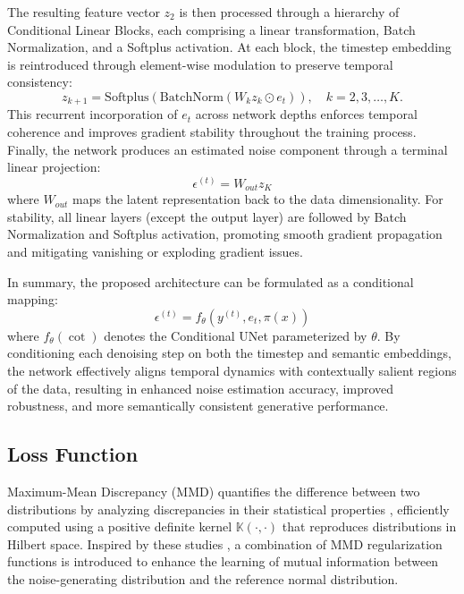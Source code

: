 \documentclass[a4paper,fleqn]{cas-sc}
\begin{document}
The resulting feature vector $z_2$ is then processed through a hierarchy of Conditional Linear Blocks, each comprising a linear transformation, Batch Normalization, and a Softplus activation. At each block, the timestep embedding is reintroduced through element-wise modulation to preserve temporal consistency:
\begin{equation}
    z_{k+1}=\text{Softplus}\left(\text{BatchNorm}\left(W_k z_k\odot e_t\right)\right),\quad k=2,3,\ldots,K.
\end{equation}
This recurrent incorporation of $e_t$ across network depths enforces temporal coherence and improves gradient stability throughout the training process. Finally, the network produces an estimated noise component through a terminal linear projection:
\begin{equation}
    \epsilon^{(t)}=W_{out}z_K
\end{equation}
where $W_{out}$ maps the latent representation back to the data dimensionality. For stability, all linear layers (except the output layer) are followed by Batch Normalization and Softplus activation, promoting smooth gradient propagation and mitigating vanishing or exploding gradient issues.

In summary, the proposed architecture can be formulated as a conditional mapping:
\begin{equation}
    \epsilon^{(t)}=f_\theta\left(y^{(t)},e_t,\pi\left(x\right)\right)
\end{equation}
where $f_\theta(\cot)$ denotes the Conditional UNet parameterized by $\theta$. By conditioning each denoising step on both the timestep and semantic embeddings, the network effectively aligns temporal dynamics with contextually salient regions of the data, resulting in enhanced noise estimation accuracy, improved robustness, and more semantically consistent generative performance.

\subsection{Loss Function}
Maximum-Mean Discrepancy (MMD) quantifies the difference between two distributions by analyzing discrepancies in their statistical properties \cite{keller2025histokernel,sun2024mmd}, efficiently computed using a positive definite kernel \( \mathbb{K}(\cdot,\cdot) \) that reproduces distributions in Hilbert space. Inspired by these studies \cite{zhao2019infovae,sinha2021d2c,huang2018introvae}, a combination of MMD regularization functions is introduced to enhance the learning of mutual information between the noise-generating distribution and the reference normal distribution.  
\end{document}
